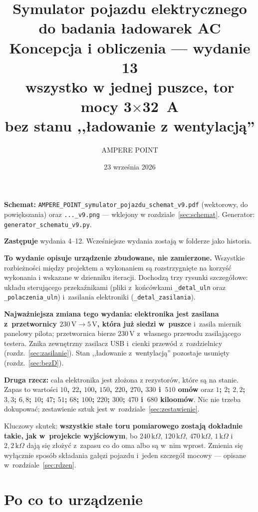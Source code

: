 \documentclass[a4paper,11pt]{article}
\title{\vspace{-1.5cm}Symulator pojazdu elektrycznego do badania ładowarek AC\\[2mm]
\large Koncepcja i obliczenia --- wydanie 13\\[1mm]
\normalsize wszystko w jednej puszce, tor mocy 3$\times$32~A\\[1mm]
\normalsize bez stanu ,,ładowanie z wentylacją''}
\author{AMPERE POINT}
\date{23 września 2026}
\newcommand{\kohm}{\,\mathrm{k}\Omega}
\newcommand{\volt}{\,\mathrm{V}}
\begin{document}
\maketitle
\thispagestyle{empty}

\noindent\textbf{Schemat:} \texttt{AMPERE\_POINT\_symulator\_pojazdu\_schemat\_v9.pdf}
(wektorowy, do powiększania) oraz \texttt{...\_v9.png} --- wklejony w rozdziale~\ref{sec:schemat}.
Generator: \texttt{generator\_schematu\_v9.py}.

\noindent\textbf{Zastępuje} wydania 4--12. Wcześniejsze wydania zostają w folderze jako
historia.

\noindent\textbf{To wydanie opisuje urządzenie zbudowane, nie zamierzone.} Wszystkie
rozbieżności między projektem a wykonaniem są rozstrzygnięte na korzyść wykonania
i wskazane w dzienniku iteracji. Dochodzą trzy rysunki szczegółowe: układu
sterującego przekaźnikami (pliki z~końcówkami \texttt{\_detal\_uln} oraz
\texttt{\_polaczenia\_uln}) i~zasilania elektroniki (\texttt{\_detal\_zasilania}).

\noindent\textbf{Najważniejsza zmiana tego wydania:} \textbf{elektronika jest zasilana
z~przetwornicy $230\volt\to5\volt$, która już siedzi w~puszce} i~zasila miernik panelowy
pilota; przetwornica bierze $230\volt$ z~własnego przewodu zasilającego testera.
Znika zewnętrzny zasilacz USB i~cienki przewód z~rozdzielnicy (rozdz.~\ref{sec:zasilanie}).
Stan ,,ładowanie z~wentylacją'' pozostaje usunięty (rozdz.~\ref{sec:bezD}).

\noindent\textbf{Druga rzecz:} cała elektronika jest złożona z rezystorów, które
są na stanie. Zapas to wartości \textbf{$10$, $22$, $100$, $150$, $220$, $270$, $330$
i~$510$ omów} oraz \textbf{$1$; $2$; $2{,}2$; $3{,}3$; $6{,}8$; $10$; $47$; $51$; $68$;
$100$; $220$; $300$; $470$ i~$680$ kiloomów}. Nic nie trzeba dokupować; zestawienie sztuk
jest w~rozdziale~\ref{sec:zestawienie}.

\noindent Kluczowy skutek: \textbf{wszystkie stałe toru pomiarowego zostają dokładnie takie,
jak w~projekcie wyjściowym}, bo $240\kohm$, $120\kohm$, $470\kohm$, $1\kohm$ i~$2{,}2\kohm$
dają się złożyć z~zapasu co do oma albo są w~nim wprost. Zmienia się wyłącznie sposób
składania gałęzi pojazdu i~jeden szczegół mocowy --- opisane w~rozdziale~\ref{sec:rdzen}.

\tableofcontents

\section{Po co to urządzenie}
\end{document}
